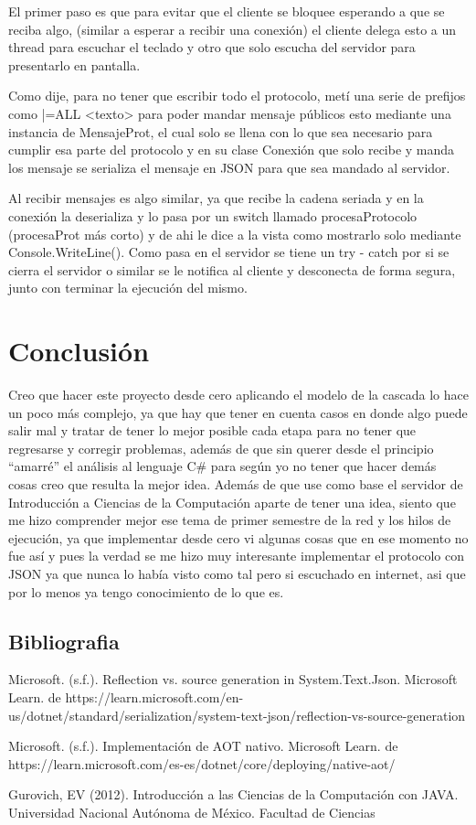 \documentclass[12pt,letterpaper]{article}
\begin{document}
El primer paso es que para evitar que el cliente se bloquee esperando a que se reciba algo, (similar a esperar a recibir una conexión) el cliente delega esto a un thread para escuchar el teclado y otro que solo escucha del servidor para presentarlo en pantalla.

Como dije, para no tener que escribir todo el protocolo, metí una serie de prefijos como |=ALL <texto> para poder mandar mensaje públicos esto mediante una instancia de MensajeProt, el cual solo se llena con lo que sea necesario para cumplir esa parte del protocolo y en su clase Conexión que solo recibe y manda los mensaje se serializa el mensaje en JSON para que sea mandado al servidor.

Al recibir mensajes es algo similar, ya que recibe la cadena seriada y en la conexión la deserializa y lo pasa por un switch llamado procesaProtocolo (procesaProt más corto) y de ahi le dice a la vista como mostrarlo solo mediante Console.WriteLine(). Como pasa en el servidor se tiene un try - catch por si se cierra el servidor o similar se le notifica al cliente y desconecta de forma segura, junto con terminar la ejecución del mismo.

\newpage
\section{Conclusión}
Creo que hacer este proyecto desde cero aplicando el modelo de la cascada lo hace un poco más complejo, ya que hay que tener en cuenta casos en donde algo puede salir mal y tratar de tener lo mejor posible cada etapa para no tener que regresarse y corregir problemas, además de que sin querer desde el principio ``amarré'' el análisis al lenguaje C\# para según yo no tener que hacer demás cosas creo que resulta la mejor idea. Además de que use como base el servidor de Introducción a Ciencias de la Computación aparte de tener una idea, siento que me hizo comprender mejor ese tema de primer semestre de la red y los hilos de ejecución, ya que implementar desde cero vi algunas cosas que en ese momento no fue así y pues la verdad se me hizo muy interesante implementar el protocolo con JSON ya que nunca lo había visto como tal pero si escuchado en internet, asi que por lo menos ya tengo conocimiento de lo que es.


\subsection{Bibliografia}
Microsoft. (s.f.). Reflection vs. source generation in System.Text.Json. Microsoft Learn. de https://learn.microsoft.com/en-us/dotnet/standard/serialization/system-text-json/reflection-vs-source-generation

Microsoft. (s.f.). Implementación de AOT nativo. Microsoft Learn.  de https://learn.microsoft.com/es-es/dotnet/core/deploying/native-aot/

Gurovich, EV (2012). Introducción a las Ciencias de la Computación con JAVA. Universidad Nacional Autónoma de México. Facultad de Ciencias
\end{document}
